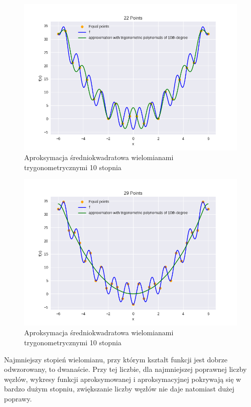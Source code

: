 \documentclass{article}
\begin{document}
\begin{figure}[H]
    \centering
    \includegraphics[width=\textwidth]{img/tripoly_10_22.png}
    \caption{Aproksymacja średniokwadratowa wielomianami trygonometrycznymi 10 stopnia}
\end{figure}

\begin{figure}[H]
    \centering
    \includegraphics[width=\textwidth]{img/tripoly_10_29.png}
    \caption{Aproksymacja średniokwadratowa wielomianami trygonometrycznymi 10 stopnia}
\end{figure}

Najmniejszy stopień wielomianu, przy którym kształt funkcji jest dobrze odwzorowany, to dwanaście. Przy tej liczbie, dla najmniejszej poprawnej liczby
węzłów, wykresy funkcji aproksymowanej i aproksymacyjnej pokrywają się w bardzo dużym stopniu, zwiększanie liczby węzłów nie daje natomiast
dużej poprawy.
\end{document}
